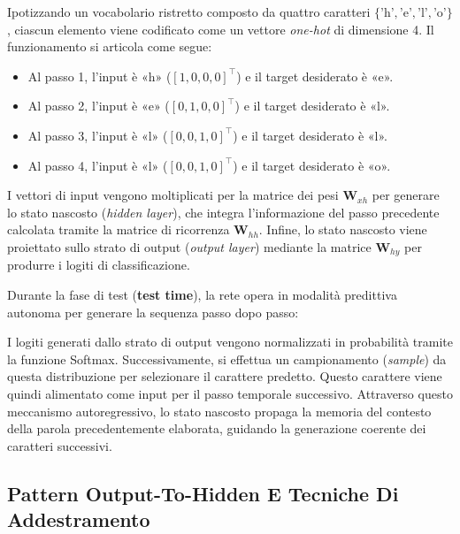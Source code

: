 ﻿\documentclass[11pt, a4paper]{article}
\begin{document}

Ipotizzando un vocabolario ristretto composto da quattro caratteri $\{\text{'h'}, \text{'e'}, \text{'l'}, \text{'o'}\}$, ciascun elemento viene codificato come un vettore \emph{one-hot} di dimensione 4. Il funzionamento si articola come segue:
\begin{itemize}[noitemsep]
    \item Al passo 1, l'input è «h» ($[1, 0, 0, 0]^\top$) e il target desiderato è «e».
    \item Al passo 2, l'input è «e» ($[0, 1, 0, 0]^\top$) e il target desiderato è «l».
    \item Al passo 3, l'input è «l» ($[0, 0, 1, 0]^\top$) e il target desiderato è «l».
    \item Al passo 4, l'input è «l» ($[0, 0, 1, 0]^\top$) e il target desiderato è «o».
\end{itemize}

I vettori di input vengono moltiplicati per la matrice dei pesi $\bm{W}_{xh}$ per generare lo stato nascosto (\emph{hidden layer}), che integra l'informazione del passo precedente calcolata tramite la matrice di ricorrenza $\bm{W}_{hh}$. Infine, lo stato nascosto viene proiettato sullo strato di output (\emph{output layer}) mediante la matrice $\bm{W}_{hy}$ per produrre i logiti di classificazione.

Durante la fase di test (\textbf{test time}), la rete opera in modalità predittiva autonoma per generare la sequenza passo dopo passo:


I logiti generati dallo strato di output vengono normalizzati in probabilità tramite la funzione Softmax. Successivamente, si effettua un campionamento (\emph{sample}) da questa distribuzione per selezionare il carattere predetto. Questo carattere viene quindi alimentato come input per il passo temporale successivo. Attraverso questo meccanismo autoregressivo, lo stato nascosto propaga la memoria del contesto della parola precedentemente elaborata, guidando la generazione coerente dei caratteri successivi.

\subsection{Pattern Output-To-Hidden E Tecniche Di Addestramento}
\end{document}
